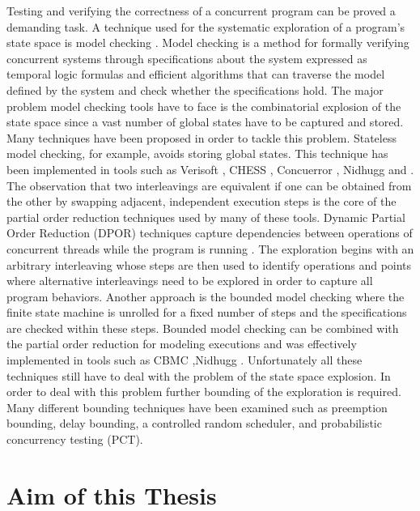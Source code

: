 Testing and verifying the correctness of a concurrent program can be proved a demanding task. 
A technique used for the systematic exploration of a program's state space is model checking \cite{WikipediaModelChecking}.
Model checking is a method for formally verifying concurrent systems through specifications about the system expressed as 
temporal logic formulas and efficient algorithms that can traverse the model defined by the system and check whether
the specifications hold. The major problem model checking tools have to face is the combinatorial explosion of the state space since
a vast number of global states have to be captured and stored. Many techniques have been proposed in order to tackle this problem.
Stateless model checking, for example, avoids storing global states. This technique has been implemented in tools such as Verisoft \cite{SMC,Gode05}, 
CHESS \cite{Musu08}, Concuerror \cite{Chri13}, Nidhugg \cite{AbdullaAronisAtigJonssonLeonardssonSagonasSMC2015} and \cite{RCMC}. The observation that two 
interleavings are equivalent if one can be obtained from the other by swapping adjacent, independent execution steps is the core of the partial
order reduction \cite{Valmari1991, Peled1993, Godefroid1996,POR,JACM} techniques used by many of these tools. Dynamic Partial Order Reduction (DPOR) techniques
capture dependencies between operations of concurrent threads while the program is running \cite{FlanaganDPOR,JACM}. The exploration begins with an arbitrary interleaving whose steps are then
used to identify operations and points where alternative interleavings need to
be explored in order to capture all program behaviors. Another approach is the bounded model checking \cite{BoundedModelChecking} where the finite state
machine is unrolled for a fixed number of steps and the specifications are checked within these steps. Bounded model checking can be combined with the partial
order reduction for modeling executions \cite{PORinBMC} and was effectively implemented in tools such as CBMC \cite{CBMC},Nidhugg \cite{AbdullaAronisJohnssonSagonasDPOR2014, RCMC}.
Unfortunately all these techniques still have to deal with the problem of the state space explosion. In order to deal with this problem further
bounding of the exploration is required. Many different bounding techniques have been examined \cite{Thomson} such as preemption bounding, delay
bounding, a controlled random scheduler, and probabilistic concurrency testing (PCT).

\section{Aim of this Thesis}

